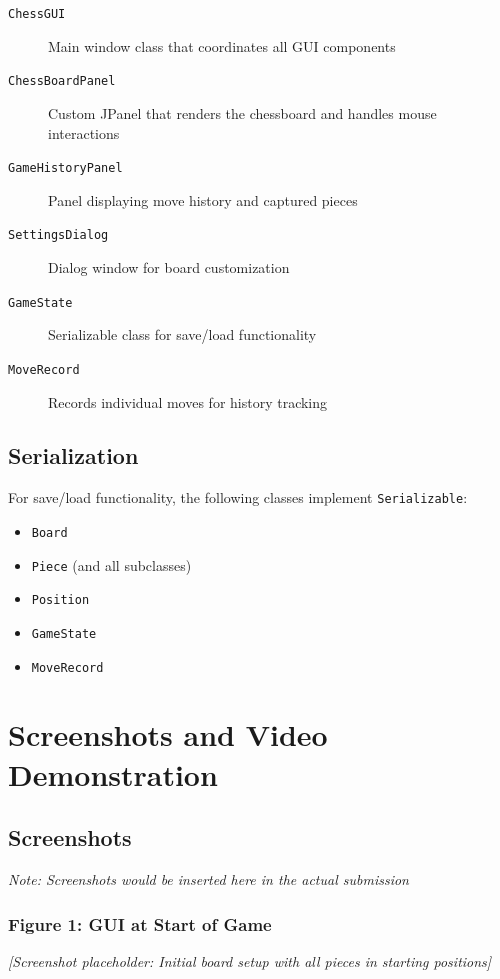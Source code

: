 \documentclass[12pt]{article}
\begin{document}
\begin{description}
    \item[\texttt{ChessGUI}] Main window class that coordinates all GUI components
    \item[\texttt{ChessBoardPanel}] Custom JPanel that renders the chessboard and handles mouse interactions
    \item[\texttt{GameHistoryPanel}] Panel displaying move history and captured pieces
    \item[\texttt{SettingsDialog}] Dialog window for board customization
    \item[\texttt{GameState}] Serializable class for save/load functionality
    \item[\texttt{MoveRecord}] Records individual moves for history tracking
\end{description}

\subsection{Serialization}

For save/load functionality, the following classes implement \texttt{Serializable}:
\begin{itemize}
    \item \texttt{Board}
    \item \texttt{Piece} (and all subclasses)
    \item \texttt{Position}
    \item \texttt{GameState}
    \item \texttt{MoveRecord}
\end{itemize}

\section{Screenshots and Video Demonstration}

\subsection{Screenshots}

\textit{Note: Screenshots would be inserted here in the actual submission}

\subsubsection{Figure 1: GUI at Start of Game}
\textit{[Screenshot placeholder: Initial board setup with all pieces in starting positions]}
\end{document}
